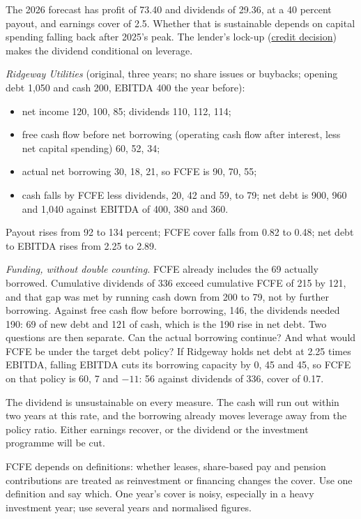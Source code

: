 \begin{qfmethod}
The 2026 forecast has profit of 73.40 and dividends of 29.36, at a 40 percent payout, and earnings cover of 2.5. Whether that is sustainable depends on capital spending falling back after 2025's peak. The lender's lock-up (\hyperref[ex:integrated-credit-decision]{credit decision}) makes the dividend conditional on leverage.

\emph{Ridgeway Utilities} (original, three years; no share issues or buybacks; opening debt 1,050 and cash 200, EBITDA 400 the year before):
\begin{itemize}
\item net income 120, 100, 85; dividends 110, 112, 114;
\item free cash flow before net borrowing (operating cash flow after interest, less net capital spending) 60, 52, 34;
\item actual net borrowing 30, 18, 21, so FCFE is 90, 70, 55;
\item cash falls by FCFE less dividends, 20, 42 and 59, to 79; net debt is 900, 960 and 1,040 against EBITDA of 400, 380 and 360.
\end{itemize}
Payout rises from 92 to 134 percent; FCFE cover falls from 0.82 to 0.48; net debt to EBITDA rises from 2.25 to 2.89.

\emph{Funding, without double counting.} FCFE already includes the 69 actually borrowed. Cumulative dividends of 336 exceed cumulative FCFE of 215 by 121, and that gap was met by running cash down from 200 to 79, not by further borrowing. Against free cash flow before borrowing, 146, the dividends needed 190: 69 of new debt and 121 of cash, which is the 190 rise in net debt. Two questions are then separate. Can the actual borrowing continue? And what would FCFE be under the target debt policy? If Ridgeway holds net debt at 2.25 times EBITDA, falling EBITDA cuts its borrowing capacity by 0, 45 and 45, so FCFE on that policy is 60, 7 and $-11$: 56 against dividends of 336, cover of 0.17.

The dividend is unsustainable on every measure. The cash will run out within two years at this rate, and the borrowing already moves leverage away from the policy ratio. Either earnings recover, or the dividend or the investment programme will be cut.

 FCFE depends on definitions: whether leases, share-based pay and pension contributions are treated as reinvestment or financing changes the cover. Use one definition and say which. One year's cover is noisy, especially in a heavy investment year; use several years and normalised figures.


\end{qfmethod}
